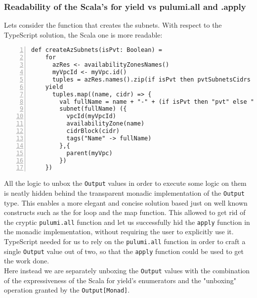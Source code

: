 \subsubsection{Readability of the Scala's for yield vs pulumi.all and .apply}
\label{sssec:readability-for-yield}
Lets consider the function that creates the subnets.
With respect to the TypeScript solution, the Scala one is more readable:\\
\begin{minipage}{\linewidth}
  \begin{lstlisting}[numbers=left, numberstyle=\tiny, numbersep=-5pt, stepnumber=1]
  def createAzSubnets(isPvt: Boolean) =
    for
      azRes <- availabilityZonesNames()
      myVpcId <- myVpc.id()
      tuples = azRes.names().zip(if isPvt then pvtSubnetsCidrs else pubSubnetsCidrs)
    yield
      tuples.map((name, cidr) => {
        val fullName = name + "-" + (if isPvt then "pvt" else "pub") + "-subnet-scala"
        subnet(fullName) ({
          vpcId(myVpcId)
          availabilityZone(name)
          cidrBlock(cidr)
          tags("Name" -> fullName)
        },{
          parent(myVpc)
        })
    })
  \end{lstlisting}
\end{minipage}
All the logic to unbox the \texttt{Output} values in order to execute some logic on them is neatly hidden behind the transparent monadic implementation of the \texttt{Output} type.
This enables a more elegant and concise solution based just on well known constructs such as the for loop and the map function.
This allowed to get rid of the cryptic \texttt{pulumi.all} function and let us successfully hid the \texttt{apply} function in the monadic implementation, without requiring the user to explicitly use it.\\
TypeScript needed for us to rely on the \texttt{pulumi.all} function in order to craft a single \texttt{Output} value out of two, so that the \texttt{apply} function could be used to get the work done.\\
Here instead we are separately unboxing the \texttt{Output} values with the combination of the expressiveness of the Scala for yield's enumerators and the "unboxing" operation granted by the \texttt{Output[Monad]}.\\
